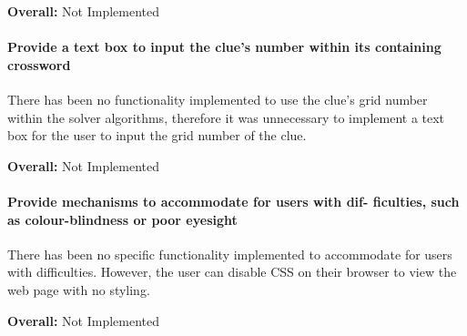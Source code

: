{\bf Overall:} Not Implemented

\paragraph{Provide a text box to input the clue's number within its
containing crossword}

There has been no functionality implemented to use the clue's grid number 
within the solver algorithms, therefore it was unnecessary to implement 
a text box for the user to input the grid number of the clue. 
 
{\bf Overall:} Not Implemented

\paragraph{Provide mechanisms to accommodate for users with dif-
ficulties, such as colour-blindness or poor eyesight}
    
There has been no specific functionality implemented to accommodate for 
users with difficulties. However, the user can disable CSS on their browser
 to view the web page with no styling. 

{\bf Overall:} Not Implemented